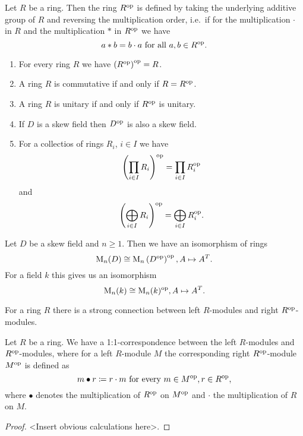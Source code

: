 \begin{defi}
  Let $R$ be a ring. Then the ring $R^{\mathrm{op}}$ is defined by taking the underlying additive group of $R$ and reversing the multiplication order, i.e.\ if for the multiplication $\cdot$ in $R$ and the multiplication $*$ in $R^{\mathrm{op}}$ we have
  \[
      a * b
    = b \cdot a
    \text{ for all }
    a, b \in R^{\mathrm{op}}.
  \]
\end{defi}


\begin{rem}
  \begin{enumerate}[label=\emph{\alph*)},leftmargin=*]
    \item
      For every ring $R$ we have $\left( R^{\mathrm{op}} \right)^{\mathrm{op}} = R$.
    \item
      A ring $R$ is commutative if and only if $R = R^{\mathrm{op}}$.
    \item
      A ring $R$ is unitary if and only if $R^{\mathrm{op}}$ is unitary.
    \item
      If $D$ is a skew field then $D^{\mathrm{op}}$ is also a skew field.
    \item
      For a collectios of rings $R_i$, $i \in I$ we have
      \[
          \left( \prod_{i \in I} R_i \right)^{\mathrm{op}}
        = \prod_{i \in I} R_i^{\mathrm{op}}
      \]
      and
      \[
          \left( \bigoplus_{i \in I} R_i \right)^{\mathrm{op}}
        = \bigoplus_{i \in I} R_i^{\mathrm{op}}.
      \]
  \end{enumerate}
\end{rem}


\begin{expl}
  Let $D$ be a skew field and $n \geq 1$.
  Then we have an isomorphism of rings
  \[
            \operatorname{M}_n(D)
    \cong   \operatorname{M}_n\left( D^{\mathrm{op}} \right)^{\mathrm{op}},
            A
    \mapsto A^T.
  \]
  For a field $k$ this gives us an isomorphism
  \[
            \operatorname{M}_n(k)
    \cong   \operatorname{M}_n(k)^{\mathrm{op}},
            A
    \mapsto A^T.
  \]
\end{expl}


For a ring $R$ there is a strong connection between left $R$-modules and right $R^{\mathrm{op}}$-modules.


\begin{prop}\label{prop: opposite modules}
  Let $R$ be a ring.
  We have a 1:1-correspondence between the left $R$-modules and $R^{\mathrm{op}}$-modules, where for a left $R$-module $M$ the corresponding right $R^{\mathrm{op}}$-module $M^{\mathrm{op}}$ is defined as
  \[
              m \bullet r
    \coloneqq r \cdot m
    \text{ for every }
    m \in M^{\mathrm{op}},
    r \in R^{\mathrm{op}},
  \]
  where $\bullet$ denotes the multiplication of $R^{\mathrm{op}}$ on $M^{\mathrm{op}}$ and $\cdot$ the multiplication of $R$ on $M$.
\end{prop}
\begin{proof}
  <Insert obvious calculations here>.
\end{proof}


